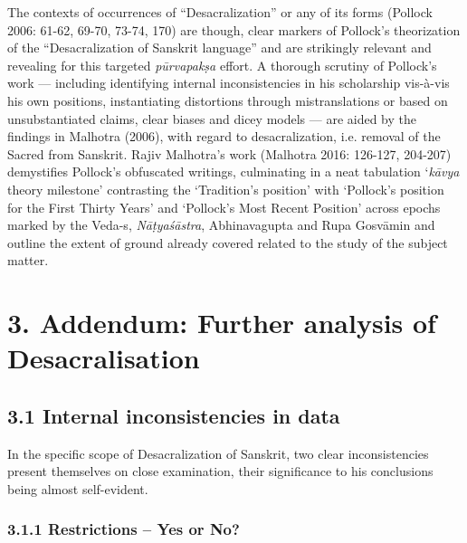 The contexts of occurrences of “Desacralization” or any of its forms (Pollock 2006: 61-62, 69-70, 73-74, 170) are though, clear markers of Pollock’s theorization of the “Desacralization of Sanskrit language” and are strikingly relevant and revealing for this targeted \textit{pūrvapakṣa} effort. A thorough scrutiny of Pollock’s work — including identifying internal inconsistencies in his scholarship vis-à-vis his own positions, instantiating distortions through mistranslations or based on unsubstantiated claims, clear biases and dicey models — are aided by the findings in Malhotra (2006), with regard to desacralization, i.e. removal of the Sacred from Sanskrit. Rajiv Malhotra’s work (Malhotra 2016: 126-127, 204-207) demystifies Pollock’s obfuscated writings, culminating in a neat tabulation ‘\textit{kāvya} theory milestone’ contrasting the ‘Tradition’s position’ with ‘Pollock’s position for the First Thirty Years’ and ‘Pollock’s Most Recent Position’ across epochs marked by the Veda-s, \textit{Nāṭyaśāstra}, Abhinavagupta and Rupa Gosvāmin and outline the extent of ground already covered related to the study of the subject matter.


\section*{3. Addendum: Further analysis of Desacralisation}

\subsection*{3.1 Internal inconsistencies in data}

In the specific scope of Desacralization of Sanskrit, two clear inconsistencies present themselves on close examination, their significance to his conclusions being almost self-evident.

\subsubsection*{3.1.1 Restrictions – Yes or No?}

